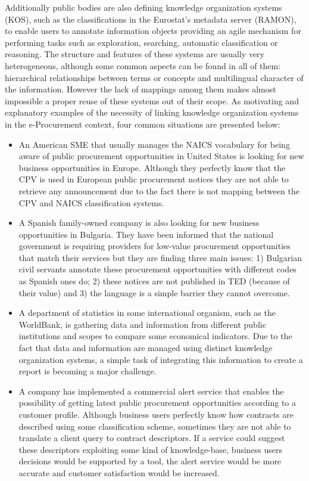 Additionally public bodies are also defining knowledge organization systems (KOS), such as the classifications in the Eurostat's metadata server (RAMON), 
to enable users to annotate information objects providing an agile mechanism for performing tasks such as exploration, searching, 
automatic classification or reasoning. The structure and features of these systems are usually very heterogeneous, 
although some common aspects can be found in all of them: hierarchical relationships between terms or concepts and multilingual character of the information. 
However the lack of mappings among them makes almost impossible a proper reuse of these systems out of their scope. As motivating and 
explanatory examples of the necessity of linking knowledge organization systems in the e-Procurement context, 
four common situations are presented below:

\begin{itemize}
 \item An American SME that usually manages the NAICS vocabulary for being aware of public procurement 
opportunities in United States is looking for new business opportunities in Europe. Although they perfectly 
know that the CPV is used in European public procurement notices they are not able to retrieve 
any announcement due to the fact there is not mapping between the CPV and NAICS classification systems.
\item A Spanish family-owned company is also looking for new business opportunities in Bulgaria. They have been informed 
that the national government is requiring providers for low-value procurement opportunities that match their services but they 
are finding three main issues: 1) Bulgarian civil servants annotate these procurement opportunities with different codes as Spanish ones do; 2) 
these notices are not published in TED (because of their value) and 3) the language is a simple barrier they cannot overcome.
\item A department of statistics in some international organism, such as the WorldBank, is gathering data and information 
from different public institutions and scopes to compare some economical indicators. Due to the fact that data and information are managed 
using distinct knowledge organization systems, a simple task of integrating this information to create a report is becoming a major challenge.
\item A company has implemented a commercial alert service that enables the possibility of getting latest public 
procurement opportunities according to a customer profile. Although business users perfectly know how contracts are described using 
some classification scheme, sometimes they are not able to translate a client query to contract descriptors. If a 
service could suggest these descriptors exploiting some kind of knowledge-base, business users decisions would be supported by a tool, 
the alert service would be more accurate and customer satisfaction would be increased.
\end{itemize}

